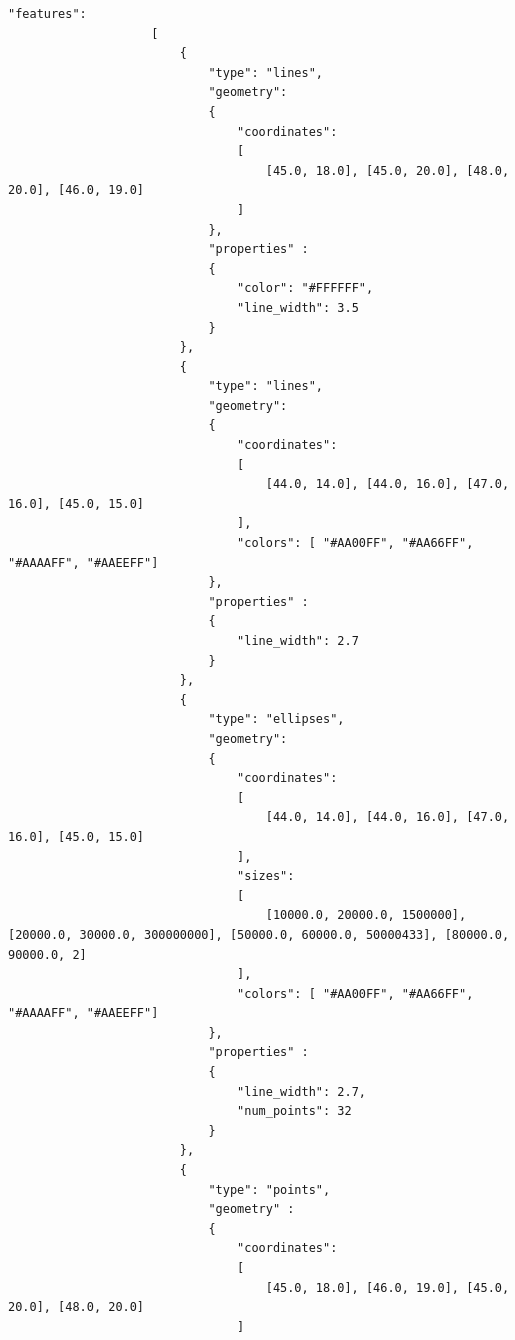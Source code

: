 \begin{lstlisting}[basicstyle=\small\ttfamily]
                    "features":
                    [
                        {
                            "type": "lines",
                            "geometry":
                            {
                                "coordinates": 
                                [
                                    [45.0, 18.0], [45.0, 20.0], [48.0, 20.0], [46.0, 19.0]
                                ]
                            },
                            "properties" :
                            {
                                "color": "#FFFFFF",
                                "line_width": 3.5
                            }
                        },
                        {
                            "type": "lines",
                            "geometry":
                            {
                                "coordinates": 
                                [
                                    [44.0, 14.0], [44.0, 16.0], [47.0, 16.0], [45.0, 15.0]
                                ],
                                "colors": [ "#AA00FF", "#AA66FF", "#AAAAFF", "#AAEEFF"]
                            },
                            "properties" :
                            {
                                "line_width": 2.7
                            }
                        },
                        {
                            "type": "ellipses",
                            "geometry":
                            {
                                "coordinates": 
                                [
                                    [44.0, 14.0], [44.0, 16.0], [47.0, 16.0], [45.0, 15.0]
                                ],
                                "sizes": 
                                [
                                    [10000.0, 20000.0, 1500000], [20000.0, 30000.0, 300000000], [50000.0, 60000.0, 50000433], [80000.0, 90000.0, 2]
                                ],
                                "colors": [ "#AA00FF", "#AA66FF", "#AAAAFF", "#AAEEFF"]
                            },
                            "properties" :
                            {
                                "line_width": 2.7,
                                "num_points": 32
                            }
                        },
                        {
                            "type": "points",
                            "geometry" :
                            {
                                "coordinates": 
                                [
                                    [45.0, 18.0], [46.0, 19.0], [45.0, 20.0], [48.0, 20.0]
                                ]

\end{lstlisting}
